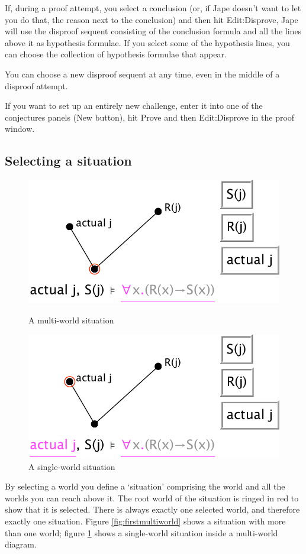 \documentclass[11pt]{article}
\begin{document}
If, during a proof attempt, you select a conclusion (or, if Jape doesn't want to let you do that, the reason next to the conclusion) and then hit Edit:Disprove, Jape will use the disproof sequent consisting of the conclusion formula and all the lines above it as hypothesis formulae. If you select some of the hypothesis lines, you can choose the collection of hypothesis formulae that appear.

You can choose a new disproof sequent at any time, even in the middle of a disproof attempt.

If you want to set up an entirely new challenge, enter it into one of the conjectures panels (New button), hit Prove and then Edit:Disprove in the proof window.

\subsection{Selecting a situation}

\begin{figure}
\centering
\parbox{200pt}{\centering
\includegraphics[scale=0.6]{pics/firstmultiworld}
\caption{A multi-world situation}
\label{fig:firstmultiworld}
}
\qquad
\parbox{200pt}{\centering
\includegraphics[scale=0.6]{pics/parvainmultum}
\caption{A single-world situation}
\label{fig:parvainmultum}
}
\end{figure}
By selecting a world you define a `situation' comprising the world and all the worlds you can reach above it. The root world of the situation is ringed in red to show that it is selected. There is always exactly one selected world, and therefore exactly one situation. Figure \ref{fig:firstmultiworld} shows a situation with more than one world; figure \ref{fig:parvainmultum} shows a single-world situation inside a multi-world diagram.
\end{document}
